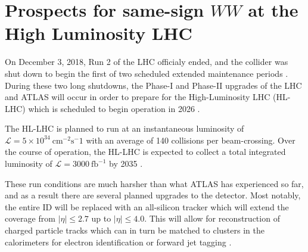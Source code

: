 \chapter[Prospects for same-sign $WW$ at the High Luminosity LHC][Prospects for same-sign $WW$ at the High Luminosity LHC]{Prospects for same-sign $WW$ at the High Luminosity LHC}
\label{ch:sswwupgrade}


On December 3, 2018, Run 2 of the LHC officialy ended, and the collider was shut down to begin the first of two scheduled extended maintenance periods \cite{2018.cern-press-run2}.
During these two long shutdowns, the Phase-I and Phase-II upgrades of the LHC and ATLAS will occur in order to prepare for the High-Luminosity LHC (HL-LHC) which is scheduled to begin operation in 2026 \cite{2011.atlas-phase1-loi}.

The HL-LHC is planned to run at an instantaneous luminosity of $\mathcal{L}=5\times 10^{34}~\textrm{cm}^{-2}\textrm{s}^-1$ with an average of 140 collisions per beam-crossing. 
Over the course of operation, the HL-LHC is expected to collect a total integrated luminosity of $\mathcal{L} = 3000~\mathrm{fb}^{-1}$ by 2035 \cite{2015.hllhc-design-report}.

These run conditions are much harsher than what ATLAS has experienced so far, and as a result there are several planned upgrades to the detector.
Most notably, the entire ID will be replaced with an all-silicon tracker which will extend the coverage from $|\eta| \le 2.7$ up to $|\eta| \le 4.0$.
This will allow for reconstruction of charged particle tracks which can in turn be matched to clusters in the calorimeters for electron identification or forward jet tagging \cite{2015.atlas-phase2-scoping}.


%

